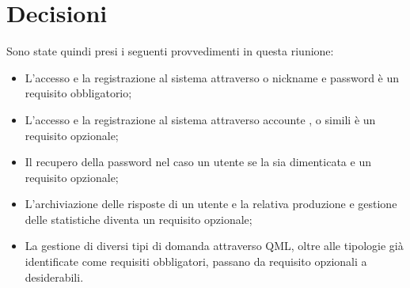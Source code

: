 \documentclass[12pt,a4paper]{article}
\begin{document}
\section{Decisioni}

Sono state quindi presi i seguenti provvedimenti in questa riunione:

\begin{itemize}
    \item L'accesso e la registrazione al sistema attraverso  o nickname e password è un requisito obbligatorio;
    \item L'accesso e la registrazione al sistema attraverso accounte ,  o simili è un requisito opzionale;
    \item Il recupero della password nel caso un utente se la sia dimenticata e un requisito opzionale;
    \item L'archiviazione delle risposte di un utente e la relativa produzione e gestione delle statistiche diventa un requisito opzionale;
    \item La gestione di diversi tipi di domanda attraverso QML, oltre alle tipologie già identificate come requisiti obbligatori, passano da requisito opzionali a desiderabili.
\end{itemize}
\end{document}
